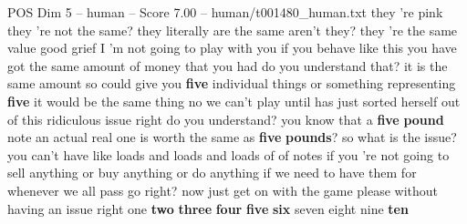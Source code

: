 \begin{textsample}{POS Dim 5 – human – Score 7.00 – human/t001480\_human.txt}  \label{ex:f5_pos_001}
they 're pink they 're not the same? they literally are the same aren't they? they 're the same value good grief I 'm not going to play with you if you behave like this you have got the same amount of money that you had do you understand that? it is the same amount so could give you \textbf{five} individual things or something representing \textbf{five} it would be the same thing no we can't play until has just sorted herself out of this ridiculous issue right do you understand? you know that a \textbf{five} \textbf{pound} note an actual real one is worth the same as \textbf{five} \textbf{pounds}? so what is the issue? you can't have like loads and loads and loads of of notes if you 're not going to sell anything or buy anything or do anything if we need to have them for whenever we all pass go right? now just get on with the game please without having an issue right one \textbf{two} \textbf{three} \textbf{four} \textbf{five} \textbf{six} seven eight nine \textbf{ten}

\end{textsample}
